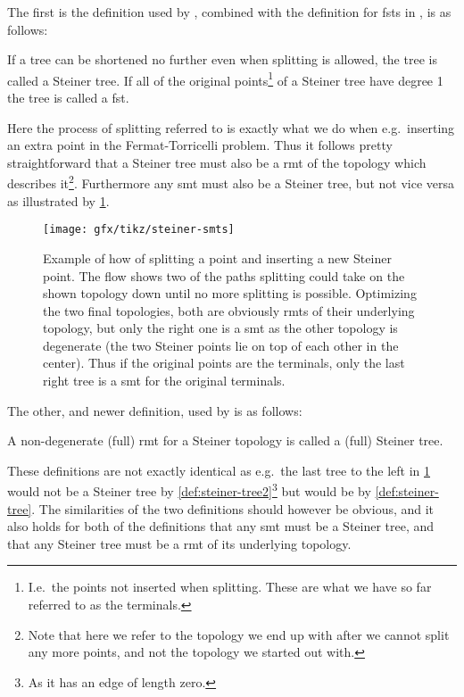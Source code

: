 The first is the definition used by \textcite{gilbert1968}, combined with the
definition for \acp{fst} in \textcite{smith1992}, is as follows:
%
\begin{definition}
  If a tree can be shortened no further even when splitting is allowed, the tree
  is called a Steiner tree. If all of the original points\footnote{I.e.\ the
    points not inserted when splitting. These are what we have so far referred
    to as the terminals.} of a Steiner tree have degree 1 the tree is called a
  \acl{fst}.\label{def:steiner-tree}
\end{definition}
%
Here the process of splitting referred to is exactly what we do when e.g.\
inserting an extra point in the Fermat-Torricelli problem. Thus it follows
pretty straightforward that a Steiner tree must also be a \ac{rmt} of the
topology which describes it\footnote{Note that here we refer to the topology we
  end up with after we cannot split any more points, and not the topology we
  started out with.}. Furthermore any \ac{smt} must also be a Steiner tree, but
not vice versa as illustrated by \cref{fig:steiner-smts}.
%
\begin{figure}[htbp]
\centering
\texttt{[image: gfx/tikz/steiner-smts]}
\caption[Example of splitting and \acp{rmt}]{Example of how of splitting a point
  and inserting a new Steiner point. The flow shows two of the paths splitting
  could take on the shown topology down until no more splitting is
  possible. Optimizing the two final topologies, both are obviously \acp{rmt} of
  their underlying topology, but only the right one is a \ac{smt} as the other
  topology is degenerate (the two Steiner points lie on top of each other in the
  center). Thus if the original points are the terminals, only the last right
  tree is a \ac{smt} for the original terminals.\label{fig:steiner-smts}}
\end{figure}
%
The other, and newer definition, used by \textcite{brazil2015} is as follows:
%
\begin{definition}
  A non-degenerate (full) \ac{rmt} for a Steiner topology is called a (full)
  Steiner tree.\label{def:steiner-tree2}
\end{definition}
%
These definitions are not exactly identical as e.g.\ the last tree to the left
in \cref{fig:steiner-smts} would not be a Steiner tree by
\cref{def:steiner-tree2}\footnote{As it has an edge of length zero.}  but would
be by \cref{def:steiner-tree}. The similarities of the two definitions should
however be obvious, and it also holds for both of the definitions that any
\ac{smt} must be a Steiner tree, and that any Steiner tree must be a \ac{rmt} of
its underlying topology.

